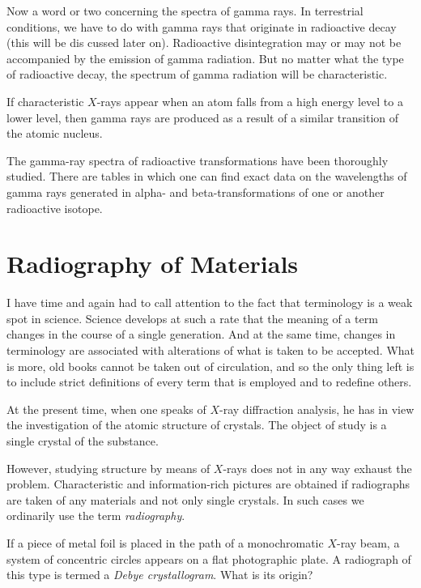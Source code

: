 Now a word or two concerning the spectra of gamma rays. In terrestrial conditions, we have to do with gamma rays that originate in radioactive decay (this will be dis­ cussed later on). Radioactive disintegration may or may not be accompanied by the emission of gamma radiation. But no matter what the type of radioactive decay, the spectrum of gamma radiation will be characteristic.

If characteristic $X$-rays appear when an atom falls from a high energy level to a lower level, then gamma rays are produced as a result of a similar transition of the atomic nucleus.

The gamma-ray spectra of radioactive transformations have been thoroughly studied. There are tables in which one can find exact data on the wavelengths of gamma rays generated in alpha- and beta-transformations of one or another radioactive isotope.

\section{Radiography of Materials}

I have time and again had to call attention to the fact that terminology is a weak spot in science. Science develops at such a rate that the meaning of a term changes in the course of a single generation. And at the same time, changes in terminology are associated with altera­tions of what is taken to be accepted. What is more, old books cannot be taken out of circulation, and so the only thing left is to include strict definitions of every term that is employed and to redefine others.

At the present time, when one speaks of $X$-ray diffrac­tion analysis, he has in view the investigation of the atomic structure of crystals. The object of study is a single crystal of the substance.

However, studying structure by means of $X$-rays does not in any way exhaust the problem. Characteristic and information-rich pictures are obtained if radiographs are taken of any materials and not only single crystals. In such cases we ordinarily use the term \emph{radiography}.

If a piece of metal foil is placed in the path of a mono­chromatic $X$-ray beam, a system of concentric circles ap­pears on a flat photographic plate. A radiograph of this type is termed a \emph{Debye crystallogram}. What is its origin?

